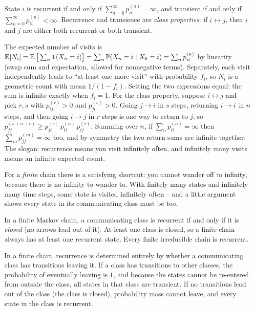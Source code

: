 \begin{theorem}
\label{ch23:recurrence-test}
State $i$ is recurrent if and only if $\displaystyle\sum_{n=0}^{\infty} p_{ii}^{(n)} = \infty$,
and transient if and only if $\displaystyle\sum_{n=0}^{\infty} p_{ii}^{(n)} < \infty$.
Recurrence and transience are \emph{class properties}: if $i \leftrightarrow j$, then $i$ and
$j$ are either both recurrent or both transient.
\end{theorem}

\begin{whybox}
The expected number of visits is $\operatorname{\mathbb{E}}[N_i] = \operatorname{\mathbb{E}}\big[\sum_n \mathbf{1}(X_n=i)\big] = \sum_n
\operatorname{\mathbb{P}}(X_n=i \mid X_0=i) = \sum_n p_{ii}^{(n)}$ by linearity (swap sum and expectation, allowed
for nonnegative terms). Separately, each visit independently leads to ``at least one more
visit'' with probability $f_i$, so $N_i$ is a geometric count with mean $1/(1-f_i)$. Setting
the two expressions equal: the sum is infinite exactly when $f_i = 1$. For the class
property, suppose $i \leftrightarrow j$ and pick $r, s$ with $p_{ij}^{(r)} > 0$ and
$p_{ji}^{(s)} > 0$. Going $j \to i$ in $s$ steps, returning $i \to i$ in $n$ steps, and then
going $i \to j$ in $r$ steps is one way to return to $j$, so
$p_{jj}^{(s+n+r)} \ge p_{ji}^{(s)}\,p_{ii}^{(n)}\,p_{ij}^{(r)}$. Summing over $n$, if
$\sum_n p_{ii}^{(n)} = \infty$ then $\sum_m p_{jj}^{(m)} = \infty$ too, and by symmetry the
two return sums are infinite together. The slogan: recurrence means you visit
infinitely often, and infinitely many visits means an infinite expected count.
\end{whybox}

For a \emph{finite} chain there is a satisfying shortcut: you cannot wander off to infinity,
because there is no infinity to wander to. With finitely many states and infinitely many time
steps, some state is visited infinitely often -- and a little argument shows every state in
its communicating class must be too.

\begin{proposition}
\label{ch23:finite-recurrence}
In a finite Markov chain, a communicating class is recurrent if and only if it is
\emph{closed} (no arrows lead out of it). At least one class is closed, so a finite chain
always has at least one recurrent state. Every finite irreducible chain is recurrent.
\end{proposition}

\begin{intuitionbox}
In a finite chain, recurrence is determined entirely by whether a communicating class has
transitions leaving it. If a class has transitions to other classes, the probability of
eventually leaving is $1$, and because the states cannot be re-entered from outside the class,
all states in that class are transient. If no transitions lead out of the class (the class is closed),
probability mass cannot leave, and every state in the class is recurrent.
\end{intuitionbox}


